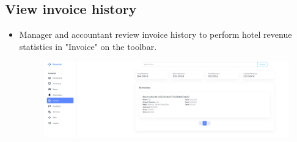     \subsection{View invoice history}
    \begin{itemize}
        \item Manager and accountant review invoice history to perform hotel revenue statistics in "Invoice" on the toolbar.
        \begin{figure}[H]
            \includegraphics[width=1\linewidth]{img/findinvoice.png}
            \label{fig:viewinvoice}
        \end{figure}
    \end{itemize}
